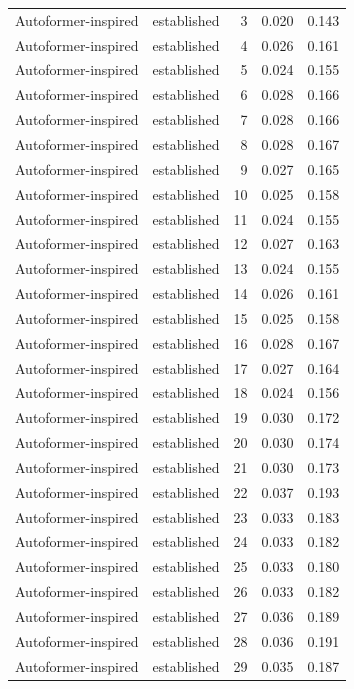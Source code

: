 \begin{tabular}{llrrr}
Autoformer-inspired & established & 3 & 0.020 & 0.143 \\
Autoformer-inspired & established & 4 & 0.026 & 0.161 \\
Autoformer-inspired & established & 5 & 0.024 & 0.155 \\
Autoformer-inspired & established & 6 & 0.028 & 0.166 \\
Autoformer-inspired & established & 7 & 0.028 & 0.166 \\
Autoformer-inspired & established & 8 & 0.028 & 0.167 \\
Autoformer-inspired & established & 9 & 0.027 & 0.165 \\
Autoformer-inspired & established & 10 & 0.025 & 0.158 \\
Autoformer-inspired & established & 11 & 0.024 & 0.155 \\
Autoformer-inspired & established & 12 & 0.027 & 0.163 \\
Autoformer-inspired & established & 13 & 0.024 & 0.155 \\
Autoformer-inspired & established & 14 & 0.026 & 0.161 \\
Autoformer-inspired & established & 15 & 0.025 & 0.158 \\
Autoformer-inspired & established & 16 & 0.028 & 0.167 \\
Autoformer-inspired & established & 17 & 0.027 & 0.164 \\
Autoformer-inspired & established & 18 & 0.024 & 0.156 \\
Autoformer-inspired & established & 19 & 0.030 & 0.172 \\
Autoformer-inspired & established & 20 & 0.030 & 0.174 \\
Autoformer-inspired & established & 21 & 0.030 & 0.173 \\
Autoformer-inspired & established & 22 & 0.037 & 0.193 \\
Autoformer-inspired & established & 23 & 0.033 & 0.183 \\
Autoformer-inspired & established & 24 & 0.033 & 0.182 \\
Autoformer-inspired & established & 25 & 0.033 & 0.180 \\
Autoformer-inspired & established & 26 & 0.033 & 0.182 \\
Autoformer-inspired & established & 27 & 0.036 & 0.189 \\
Autoformer-inspired & established & 28 & 0.036 & 0.191 \\
Autoformer-inspired & established & 29 & 0.035 & 0.187 \\

\end{tabular}
